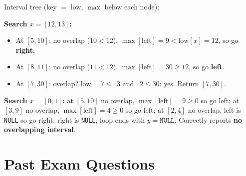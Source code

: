 \documentclass[11pt]{article}
\begin{document}
\begin{examplebox}
Interval tree (key $=$ low, $\max$ below each node):
\begin{center}
\end{center}

\textbf{Search $x = [12, 13]$:}
\begin{itemize}[leftmargin=1.4em,itemsep=1pt]
  \item At $[5,10]$: no overlap ($10 < 12$). $\max[\text{left}] = 9 < \text{low}[x] = 12$, so go \textbf{right}.
  \item At $[8,11]$: no overlap ($11 < 12$). $\max[\text{left}] = 30 \ge 12$, so go \textbf{left}.
  \item At $[7,30]$: overlap? $\text{low} = 7 \le 13$ and $12 \le 30$: \textcolor{greenO}{yes}. Return $[7,30]$.
\end{itemize}

\textbf{Search $x = [0, 1]$:} at $[5,10]$ no overlap, $\max[\text{left}] = 9 \ge 0$ so go left; at $[3,9]$ no overlap, $\max[\text{left}] = 4 \ge 0$ so go left; at $[2,4]$ no overlap, left is \texttt{NULL} so go right; right is \texttt{NULL}, loop ends with $y = \texttt{NULL}$. Correctly reports \textbf{no overlapping interval}.
\end{examplebox}

\section{Past Exam Questions}
\end{document}
